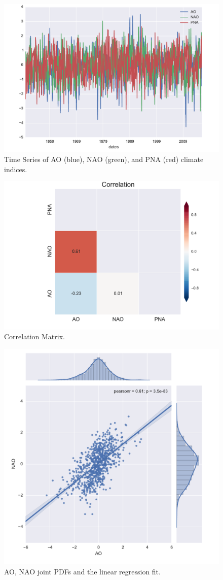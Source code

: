 \documentclass[draft,grl]{AGUTeX}
\begin{document}
\begin{figure}
\begin{center}
\includegraphics[width=0.8\linewidth]{./figs/fig1.pdf}
\caption{Time Series of AO (blue), NAO (green), and PNA (red) climate indices.}\label{fig:ts_idx}
\end{center}
\end{figure}

\begin{figure}
\begin{center}
\includegraphics[width=0.8\linewidth]{./figs/fig2.pdf}
\caption{Correlation Matrix.}\label{fig:r_matrix}
\end{center}
\end{figure}

\newpage

\begin{figure}
\begin{center}
\includegraphics[width=0.8\linewidth]{./figs/fig3.pdf}
\caption{AO, NAO joint PDFs  and the linear regression fit.}\label{fig:joint_reg}
\end{center}
\end{figure}

\
\end{document}
